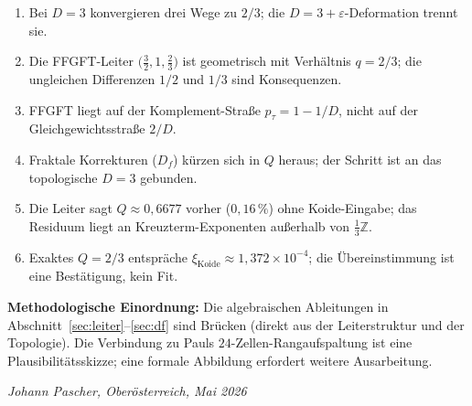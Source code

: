 \begin{enumerate}
  \item Bei \(D = 3\) konvergieren drei Wege zu \(2/3\);
        die \(D = 3+\varepsilon\)-Deformation trennt sie.
  \item Die FFGFT-Leiter
        \(\bigl(\tfrac{3}{2}, 1, \tfrac{2}{3}\bigr)\)
        ist geometrisch mit Verhältnis \(q = 2/3\);
        die ungleichen Differenzen \(1/2\) und \(1/3\) sind Konsequenzen.
  \item FFGFT liegt auf der Komplement-Straße
        \(p_\tau = 1 - 1/D\), nicht auf der Gleichgewichtsstraße \(2/D\).
  \item Fraktale Korrekturen (\(D_f\)) kürzen sich in \(Q\) heraus;
        der Schritt ist an das topologische \(D = 3\) gebunden.
  \item Die Leiter sagt \(Q \approx 0{,}6677\) vorher
        (\(0{,}16\,\%\)) ohne Koide-Eingabe;
        das Residuum liegt an Kreuzterm-Exponenten außerhalb von
        \(\tfrac{1}{3}\mathbb{Z}\).
  \item Exaktes \(Q = 2/3\) entspräche
        \(\xi_{\text{Koide}} \approx 1{,}372\times10^{-4}\);
        die Übereinstimmung ist eine Bestätigung, kein Fit.
\end{enumerate}

\bigskip
\noindent
\textbf{Methodologische Einordnung:}
Die algebraischen Ableitungen in Abschnitt~\ref{sec:leiter}--\ref{sec:df}
sind Brücken (direkt aus der Leiterstruktur und der Topologie).
Die Verbindung zu Pauls \(24\)-Zellen-Rangaufspaltung ist eine
Plausibilitätsskizze; eine formale Abbildung erfordert weitere Ausarbeitung.

\bigskip
\begin{flushright}
\textit{Johann Pascher, Oberösterreich, Mai 2026}
\end{flushright}

